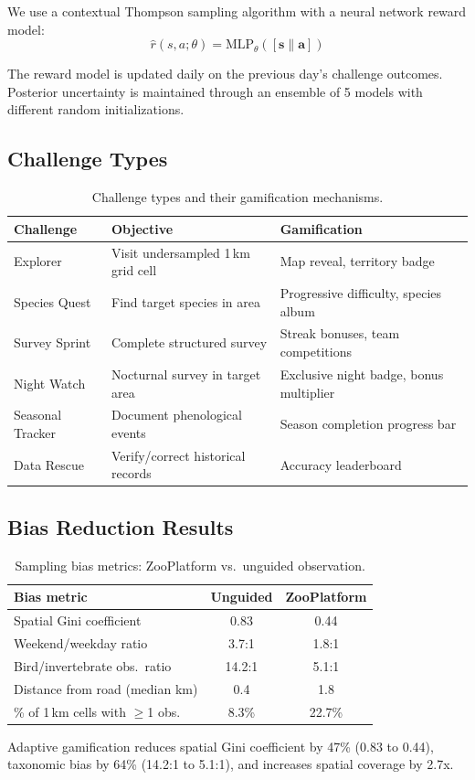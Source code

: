 We use a contextual Thompson sampling algorithm
\citep{agrawal2013thompson} with a neural network reward model:
\begin{equation}
  \hat{r}(s, a; \theta) = \text{MLP}_\theta([\mathbf{s} \| \mathbf{a}])
\end{equation}

The reward model is updated daily on the previous day's challenge
outcomes. Posterior uncertainty is maintained through an ensemble of
5 models with different random initializations.

\subsection{Challenge Types}

\begin{table}[H]
\centering
\caption{Challenge types and their gamification mechanisms.}
\label{tab:challenges}
\begin{tabular}{p{2.5cm}p{4cm}p{4.5cm}}
\toprule
\textbf{Challenge} & \textbf{Objective} & \textbf{Gamification} \\
\midrule
Explorer & Visit undersampled 1\,km grid cell & Map reveal, territory
  badge \\
Species Quest & Find target species in area & Progressive difficulty,
  species album \\
Survey Sprint & Complete structured survey & Streak bonuses, team
  competitions \\
Night Watch & Nocturnal survey in target area & Exclusive night badge,
  bonus multiplier \\
Seasonal Tracker & Document phenological events & Season completion
  progress bar \\
Data Rescue & Verify/correct historical records & Accuracy leaderboard \\
\bottomrule
\end{tabular}
\end{table}

\subsection{Bias Reduction Results}

\begin{table}[H]
\centering
\caption{Sampling bias metrics: ZooPlatform vs.\ unguided observation.}
\label{tab:bias}
\begin{tabular}{lcc}
\toprule
\textbf{Bias metric} & \textbf{Unguided} & \textbf{ZooPlatform} \\
\midrule
Spatial Gini coefficient & 0.83 & 0.44 \\
Weekend/weekday ratio & 3.7:1 & 1.8:1 \\
Bird/invertebrate obs.\ ratio & 14.2:1 & 5.1:1 \\
Distance from road (median km) & 0.4 & 1.8 \\
\% of 1\,km cells with $\geq$1 obs. & 8.3\% & 22.7\% \\
\bottomrule
\end{tabular}
\end{table}

Adaptive gamification reduces spatial Gini coefficient by 47\% (0.83 to
0.44), taxonomic bias by 64\% (14.2:1 to 5.1:1), and increases spatial
coverage by 2.7x.


